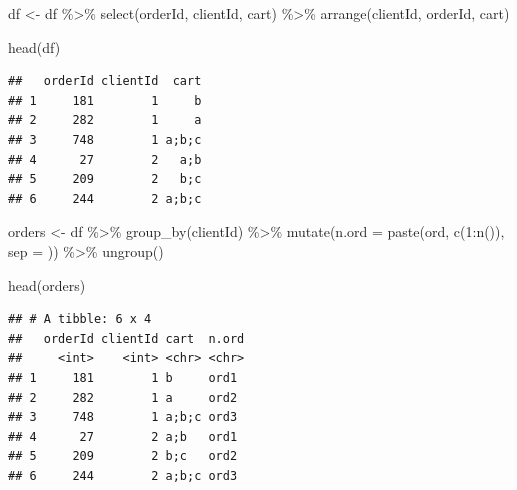 \documentclass[
]{book}
\newenvironment{Shaded}{\begin{snugshade}}{\end{snugshade}}
\newcommand{\AttributeTok}[1]{\textcolor[rgb]{0.77,0.63,0.00}{#1}}
\newcommand{\DecValTok}[1]{\textcolor[rgb]{0.00,0.00,0.81}{#1}}
\newcommand{\FunctionTok}[1]{\textcolor[rgb]{0.00,0.00,0.00}{#1}}
\newcommand{\NormalTok}[1]{#1}
\newcommand{\OtherTok}[1]{\textcolor[rgb]{0.56,0.35,0.01}{#1}}
\newcommand{\SpecialCharTok}[1]{\textcolor[rgb]{0.00,0.00,0.00}{#1}}
\newcommand{\StringTok}[1]{\textcolor[rgb]{0.31,0.60,0.02}{#1}}
\begin{document}
\begin{Shaded}
\begin{Highlighting}[]
\NormalTok{df }\OtherTok{\textless{}{-}}\NormalTok{ df }\SpecialCharTok{\%\textgreater{}\%}
    \FunctionTok{select}\NormalTok{(orderId, clientId, cart) }\SpecialCharTok{\%\textgreater{}\%}
    \FunctionTok{arrange}\NormalTok{(clientId, orderId, cart)}

\FunctionTok{head}\NormalTok{(df)}
\end{Highlighting}
\end{Shaded}

\begin{verbatim}
##   orderId clientId  cart
## 1     181        1     b
## 2     282        1     a
## 3     748        1 a;b;c
## 4      27        2   a;b
## 5     209        2   b;c
## 6     244        2 a;b;c
\end{verbatim}

\begin{Shaded}
\begin{Highlighting}[]
\NormalTok{orders }\OtherTok{\textless{}{-}}\NormalTok{ df }\SpecialCharTok{\%\textgreater{}\%}
    \FunctionTok{group\_by}\NormalTok{(clientId) }\SpecialCharTok{\%\textgreater{}\%}
    \FunctionTok{mutate}\NormalTok{(}\AttributeTok{n.ord =} \FunctionTok{paste}\NormalTok{(}\StringTok{\textquotesingle{}ord\textquotesingle{}}\NormalTok{, }\FunctionTok{c}\NormalTok{(}\DecValTok{1}\SpecialCharTok{:}\FunctionTok{n}\NormalTok{()), }\AttributeTok{sep =} \StringTok{\textquotesingle{}\textquotesingle{}}\NormalTok{)) }\SpecialCharTok{\%\textgreater{}\%}
    \FunctionTok{ungroup}\NormalTok{()}

\FunctionTok{head}\NormalTok{(orders)}
\end{Highlighting}
\end{Shaded}

\begin{verbatim}
## # A tibble: 6 x 4
##   orderId clientId cart  n.ord
##     <int>    <int> <chr> <chr>
## 1     181        1 b     ord1 
## 2     282        1 a     ord2 
## 3     748        1 a;b;c ord3 
## 4      27        2 a;b   ord1 
## 5     209        2 b;c   ord2 
## 6     244        2 a;b;c ord3
\end{verbatim}
\end{document}
